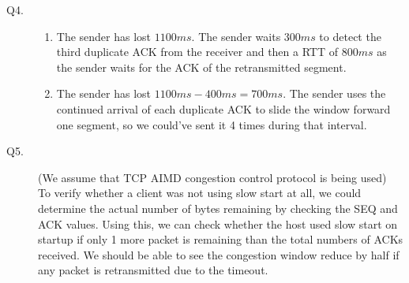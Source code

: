 \documentclass{csc_assignment}
\begin{document}
\begin{description}

\item[Q4.]
\begin{enumerate}
\item The sender has lost $1100ms$. The sender waits $300ms$ to detect the third duplicate ACK from the receiver and then a RTT of $800ms$ as the sender waits for the ACK of the retransmitted segment.
\item The sender has lost $1100ms - 400ms =700ms$. The sender uses the continued arrival of each duplicate ACK to slide the window forward one segment, so we could've sent it 4 times during that interval.
\end{enumerate}


\item[Q5.]
(We assume that TCP AIMD congestion control protocol is being used) \\
To verify whether a client was not using slow start at all, we could determine the actual number of bytes remaining by checking the SEQ and ACK values. Using this, we can check whether the host used slow start on startup if only 1 more packet is remaining than the total numbers of ACKs received. We should be able to see the congestion window reduce by half if any packet is retransmitted due to the timeout. 



\end{description}
\end{document}
